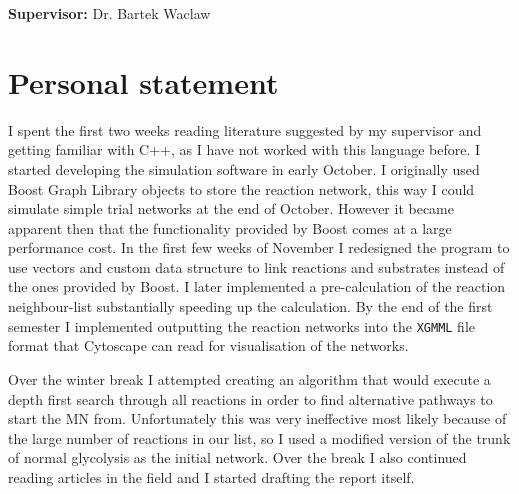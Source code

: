 \documentclass[a4paper,12pt]{article}
\begin{document}
\vfill
{\bf Supervisor:} Dr. Bartek Waclaw
\newpage



\setcounter{page}{1}
\footruleheight{1pt}
\headruleheight{1pt}
\rhead{- \thepage}
\cfoot{}

\cleardoublepage
\tableofcontents



%	
%
%
%
%
%
%


	\newpage
	\section*{Personal statement}
	I spent the first two weeks reading literature suggested by my supervisor and getting familiar with C++, as I have not worked with this language before. 
	I started developing the simulation software in early October. 	I originally used Boost Graph Library objects to store the reaction network, this way I could simulate simple trial networks at the end of October. However it became apparent then that the functionality provided by Boost comes at a large performance cost. In the first few weeks of November I redesigned the program to use vectors and custom data structure to link reactions and substrates instead of the ones provided by Boost. I later implemented a pre-calculation of the reaction neighbour-list substantially speeding up the calculation. 
	By the end of the first semester I implemented outputting the reaction networks into the \texttt{XGMML} file format that Cytoscape can read for visualisation of the networks. 

	Over the winter break I attempted creating an algorithm that would execute a depth first search through all reactions in order to find alternative pathways to start the MN from. Unfortunately this was very ineffective most likely because of the large number of reactions in our list, so I used a modified version of the trunk of normal glycolysis as the initial network. Over the break I also continued reading articles in the field and I started drafting the report itself. 
\end{document}
